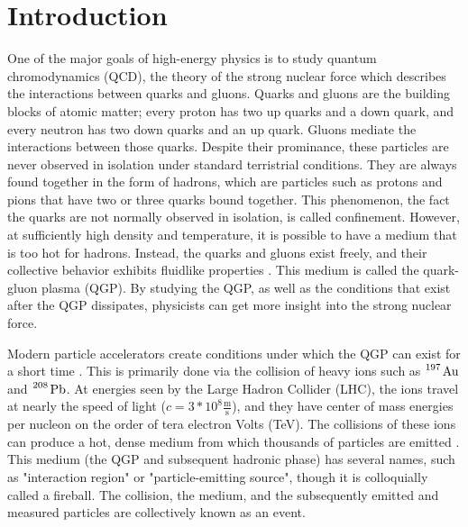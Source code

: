 \chapter{Introduction}
\label{sec:Introduction}


One of the major goals of high-energy physics is to study quantum chromodynamics (QCD), the theory of the strong nuclear force which describes the interactions between quarks and gluons.
Quarks and gluons are the building blocks of atomic matter; every proton has two up quarks and a down quark, and every neutron has two down quarks and an up quark. 
Gluons mediate the interactions between those quarks.
Despite their prominance, these particles are never observed in isolation under standard terristrial conditions.
They are always found together in the form of hadrons, which are particles such as protons and pions that have two or three quarks bound together.
This phenomenon, the fact the quarks are not normally observed in isolation, is called confinement.
However, at sufficiently high density and temperature, it is possible to have a medium that is too hot for hadrons.
Instead, the quarks and gluons exist freely, and their collective behavior exhibits fluidlike properties \cite{Heinz:2005zg}.
This medium is called the quark-gluon plasma (QGP).
By studying the QGP, as well as the conditions that exist after the QGP dissipates, physicists can get more insight into the strong nuclear force.

Modern particle accelerators create conditions under which the QGP can exist for a short time \cite{Heinz:2000bk}.
This is primarily done via the collision of heavy ions such as $\ce{^197 \mathrm{Au}}$ and $\ce{^208 \mathrm{Pb}}$.
At energies seen by the Large Hadron Collider (LHC), the ions travel at nearly the speed of light ($c = 3 * 10^8 \mathrm{\frac{m}{s}}$), and they have center of mass energies per nucleon on the order of tera electron Volts (TeV).
The collisions of these ions can produce a hot, dense medium from which thousands of particles are emitted \cite{Aamodt:2010cz}.
This medium (the QGP and subsequent hadronic phase) has several names, such as "interaction region" or "particle-emitting source", though it is colloquially called a fireball.
The collision, the medium, and the subsequently emitted and measured particles are collectively known as an event. 


